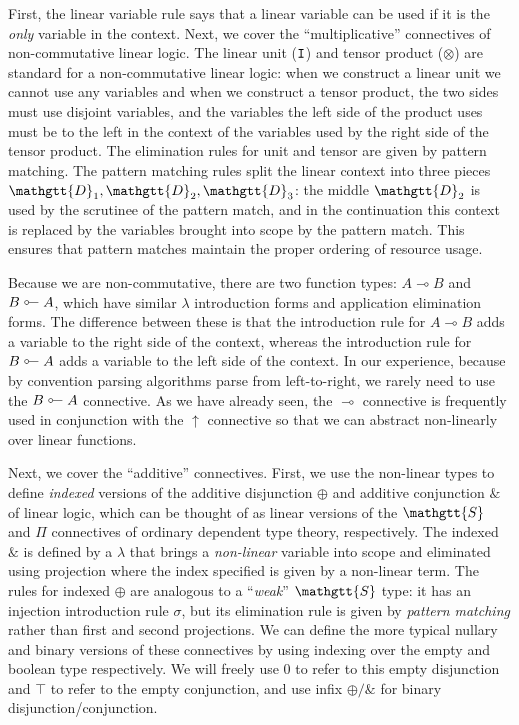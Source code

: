 \documentclass[acmsmall,nonacm]{acmart}
\renewcommand{\Delta}{\mathgtt{D}}
\renewcommand{\Sigma}{\mathgtt{S}}
\newcommand{\lto}{\multimap}
\newcommand{\tol}{\mathrel{\rotatebox[origin=c]{180}{$\lto$}}}
\begin{document}
First, the
linear variable rule says that a linear variable
can be used if it is the \emph{only} variable in the context. Next, we cover the
``multiplicative'' connectives of non-commutative
linear logic. The linear unit ($\texttt{I}$) and tensor product ($\otimes$)
are standard for a non-commutative linear logic: when we construct a
linear unit we cannot use any variables and when we construct a tensor
product, the two sides must use disjoint variables, and the variables
the left side of the product uses must be to the left in the context
of the variables used by the right side of the tensor product. The
elimination rules for unit and tensor are given by pattern
matching. The pattern matching rules split the linear context into
three pieces $\Delta_1,\Delta_2,\Delta_3$: the middle $\Delta_2$ is
used by the scrutinee of the pattern match, and in the continuation
this context is replaced by the variables brought into scope by the
pattern match. This ensures that pattern matches maintain the proper
ordering of resource usage.

Because we are non-commutative, there are two function types: $A \lto
B$ and $B \tol A$, which have similar $\lambda$ introduction forms and
application elimination forms. The difference between these is that
the introduction rule for $A \lto B$ adds a variable to the right side
of the context, whereas the introduction rule for $B \tol A$ adds a
variable to the left side of the context. In our experience, because
by convention parsing algorithms parse from left-to-right, we rarely
need to use the $B \tol A$ connective. As we have already seen, the
$\lto$ connective is frequently used in conjunction with the
$\uparrow$ connective so that we can abstract non-linearly over linear
functions.

Next, we cover the ``additive'' connectives. First, we use the
non-linear types to define \emph{indexed} versions of the additive
disjunction $\oplus$ and additive conjunction $\&$ of linear logic,
which can be thought of as linear versions of the $\Sigma$ and $\Pi$
connectives of ordinary dependent type theory, respectively. The
indexed $\&$ is defined by a $\lambda$ that brings a \emph{non-linear}
variable into scope and eliminated using projection where the index
specified is given by a non-linear term. The rules for indexed
$\oplus$ are analogous to a ``\emph{weak}'' $\Sigma$ type: it has an
injection introduction rule $\sigma$, but its elimination rule is
given by \emph{pattern matching} rather than first and second
projections. We can define the more typical nullary and binary
versions of these connectives by using indexing over the empty and
boolean type respectively. We will freely use $0$ to refer to this
empty disjunction and $\top$ to refer to the empty conjunction, and
use infix $\oplus/\&$ for binary disjunction/conjunction.
\end{document}
